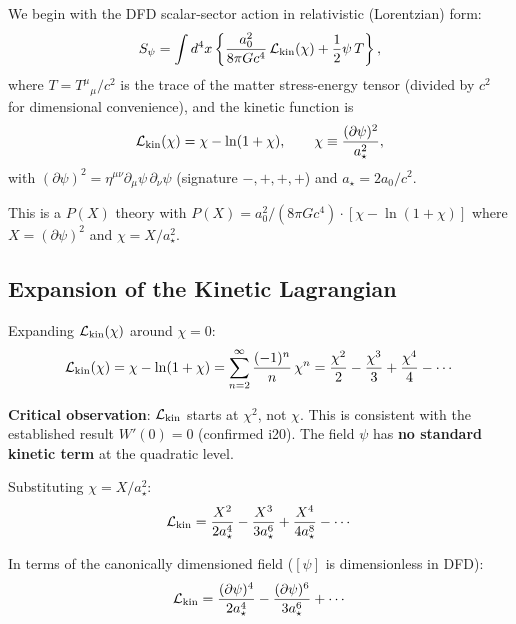 \documentclass[11pt,a4paper]{article}
\begin{document}
We begin with the DFD scalar-sector action in relativistic (Lorentzian) form:
\begin{equation}\label{eq:DFD-action}
S_\psi = \int d^4x \left\{
  \frac{a_0^2}{8\pi G c^4}\,\mathcal{L}_{\rm kin}(\chi)
  + \frac{1}{2}\psi\, T
\right\},
\end{equation}
where $T = T^\mu{}_\mu / c^2$ is the trace of the matter stress-energy tensor (divided by $c^2$ for dimensional convenience), and the kinetic function is
\begin{equation}\label{eq:L-kin}
\mathcal{L}_{\rm kin}(\chi) = \chi - \ln(1+\chi), \qquad
\chi \equiv \frac{(\partial\psi)^2}{a_\star^2},
\end{equation}
with $(\partial\psi)^2 = \eta^{\mu\nu}\partial_\mu\psi\,\partial_\nu\psi$ (signature $-,+,+,+$) and $a_\star = 2a_0/c^2$.

This is a $P(X)$ theory with $P(X) = a_0^2/(8\pi G c^4) \cdot [\chi - \ln(1+\chi)]$ where $X = (\partial\psi)^2$ and $\chi = X/a_\star^2$.

\subsection{Expansion of the Kinetic Lagrangian}

Expanding $\mathcal{L}_{\rm kin}(\chi)$ around $\chi = 0$:
\begin{equation}\label{eq:L-expansion}
\mathcal{L}_{\rm kin}(\chi) = \chi - \ln(1+\chi)
= \sum_{n=2}^{\infty} \frac{(-1)^n}{n}\,\chi^n
= \frac{\chi^2}{2} - \frac{\chi^3}{3} + \frac{\chi^4}{4} - \cdots
\end{equation}

\textbf{Critical observation}: $\mathcal{L}_{\rm kin}$ starts at $\chi^2$, not $\chi$. This is consistent with the established result $W'(0) = 0$ (confirmed i20). The field $\psi$ has \textbf{no standard kinetic term} at the quadratic level.

Substituting $\chi = X/a_\star^2$:
\begin{equation}\label{eq:L-X-expansion}
\mathcal{L}_{\rm kin} = \frac{X^2}{2a_\star^4} - \frac{X^3}{3a_\star^6} + \frac{X^4}{4a_\star^8} - \cdots
\end{equation}

In terms of the canonically dimensioned field ($[\psi]$ is dimensionless in DFD):
\begin{equation}
\mathcal{L}_{\rm kin} = \frac{(\partial\psi)^4}{2a_\star^4}
- \frac{(\partial\psi)^6}{3a_\star^6} + \cdots
\end{equation}
\end{document}
